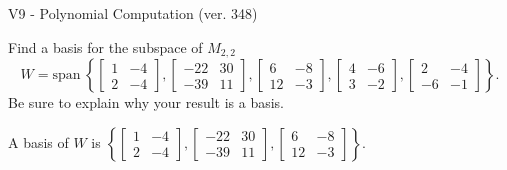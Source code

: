 \begin{exercise}
  \begin{exerciseTitle}V9 - Polynomial Computation (ver. 348)\end{exerciseTitle}
  \begin{exerciseStatement}
    Find a basis for the subspace of \(M_{2,2}\) 
\[W=\mathrm{span}\ \left\{\left[\begin{array}{cc}
1 & -4 \\
2 & -4
\end{array}\right] , \left[\begin{array}{cc}
-22 & 30 \\
-39 & 11
\end{array}\right] , \left[\begin{array}{cc}
6 & -8 \\
12 & -3
\end{array}\right] , \left[\begin{array}{cc}
4 & -6 \\
3 & -2
\end{array}\right] , \left[\begin{array}{cc}
2 & -4 \\
-6 & -1
\end{array}\right]\right\}.\]
 Be sure to explain why your result is a basis.


  \end{exerciseStatement}
  \begin{exerciseAnswer}
   A basis of \(W\) is  \(\left\{\left[\begin{array}{cc}
1 & -4 \\
2 & -4
\end{array}\right] , \left[\begin{array}{cc}
-22 & 30 \\
-39 & 11
\end{array}\right] , \left[\begin{array}{cc}
6 & -8 \\
12 & -3
\end{array}\right]\right\}\).
  


  \end{exerciseAnswer}
\end{exercise}
